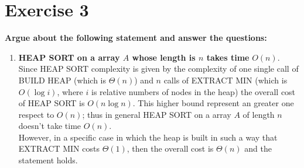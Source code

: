 \documentclass{article}
\begin{document}
	\section*{Exercise 3}
	\textbf{Argue about the following statement and answer the questions:}
	\begin{enumerate}[label=(\alph*)]
		\item \textbf{HEAP SORT on a array $A$ whose length is $n$ takes time} $O(n)$. 
		Since HEAP SORT complexity is given by the complexity of one single call of BUILD HEAP (which is $\Theta(n)$) and $n$ calls of EXTRACT MIN (which is $O(\log i)$, where $i$ is relative numbers of nodes in the heap) the overall cost of HEAP SORT is $O(n\log n)$. This higher bound represent an greater one respect to $O(n)$; thus in general HEAP SORT on a array $A$ of length $n$ doesn't take time $O(n)$. \\
		However, in a specific case in which the heap is built in such a way that EXTRACT MIN costs $\Theta(1)$, then the overall cost is $\Theta(n)$ and the statement holds.
		

\end{enumerate}
\end{document}
